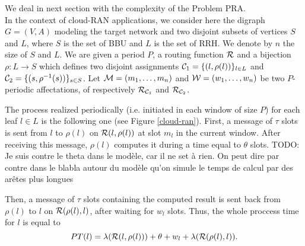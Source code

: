 \documentclass[a4paper,10pt]{article}
\newcommand{\todo}[1]{{\color{red} TODO: {#1}}}
\begin{document}
      We deal in next section with the complexity of the Problem PRA.\\
% 

      
      In the context of cloud-RAN applications, we consider here the digraph $G=(V,A)$ modeling the target network 
      and two disjoint subsets of vertices $S$ and $L$, where $S$ is the set of BBU and $L$ is the set of RRH. 
      We denote by $n$ the size of $S$ and $L$.
      We are given a period $P$, a routing function ${\cal R}$ and a bijection $\rho:L\rightarrow S$ which defines two disjoint assignments ${\cal C}_1 = \{(l,\rho(l))\}_{l \in L}$ and ${\cal C}_2 = \{(s,\rho^{-1}(s))\}_{s \in S}$. Let ${\cal M} = (m_1,\dots, m_n)$ and ${\cal W} = (w_1,\dots, w_n)$ be two $P$-periodic affectations, of respectively ${\cal R}_{{\cal C}_1}$ and ${\cal R}_{{\cal C}_2}$.
      
      The process realized periodically (i.e. initiated in each window of size $P$) for each leaf $l \in L$ is the following one (see Figure \ref{cloud-ran}). First, a message of $\tau$ slots is sent from $l$ to $\rho(l)$ on ${\cal R}(l,\rho(l))$ at slot $m_l$ in the current window. After receiving this message, $\rho(l)$ computes it during a time equal to $\theta$ slots.\todo{Je suis contre
      le theta dans le modèle, car il ne set à rien. On peut dire par contre dans le blabla autour du modèle qu'on simule le temps de calcul par des arêtes plus longues}
    
      Then, a message of $\tau$ slots containing the computed result is sent back from $\rho(l)$ to $l$ on ${\cal R}(\rho(l),l)$, after waiting for $w_l$ slots. 
      Thus, the whole proccess time for $l$ is equal to
      $$
      PT(l)=\lambda({\cal R}(l,\rho(l)))+\theta+w_l+\lambda({\cal R}(\rho(l),l)).
      $$
      
\end{document}
